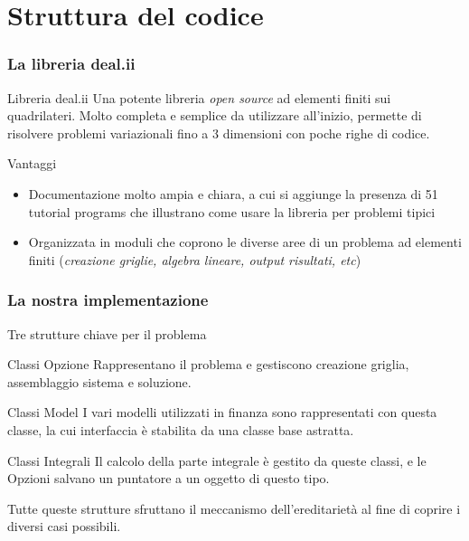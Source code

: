 \documentclass{beamer}
\begin{document}
\section{Struttura del codice}

\begin{frame}
\frametitle{La libreria \textsf{deal.ii}}
\begin{block}{Libreria \textsf{deal.ii}}
Una potente libreria \emph{open source} ad elementi finiti sui quadrilateri. Molto completa e semplice da utilizzare all'inizio, permette di risolvere problemi variazionali fino a 3 dimensioni con poche righe di codice. 
\end{block}

\pause
\begin{block}{Vantaggi}
 \begin{itemize}
  \item Documentazione molto ampia e chiara, a cui si aggiunge la presenza di 51 tutorial programs che illustrano come usare la libreria per problemi tipici
  \item Organizzata in moduli che coprono le diverse aree di un problema ad elementi finiti (\emph{creazione griglie, algebra lineare, output risultati, etc})
 \end{itemize}
\end{block}
\end{frame}

\begin{frame}
\frametitle{La nostra implementazione }
 Tre strutture chiave per il problema
 \begin{block}{Classi Opzione}
Rappresentano il problema e gestiscono creazione griglia, assemblaggio sistema e soluzione.
 \end{block}
 \begin{block}{Classi Model}
 I vari modelli utilizzati in finanza sono rappresentati con questa classe, la cui interfaccia è stabilita da una classe base astratta.
 \end{block}
 \begin{block}{Classi Integrali}
  Il calcolo della parte integrale è gestito da queste classi, e le Opzioni salvano un puntatore a un oggetto di questo tipo. 
 \end{block}
 Tutte queste strutture sfruttano il meccanismo dell'ereditarietà al fine di coprire i diversi casi possibili.
\end{frame}
\end{document}
